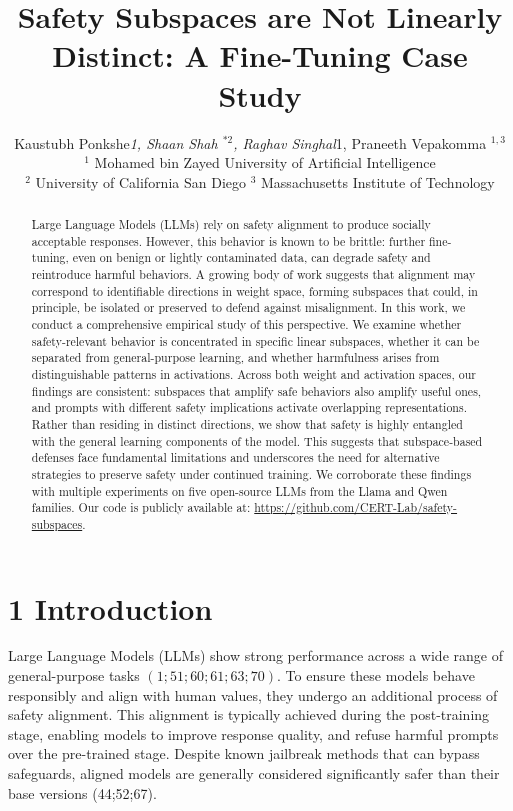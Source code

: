 \documentclass[10pt]{article}
\title{Safety Subspaces are Not Linearly Distinct: A Fine-Tuning Case Study }
\author{Kaustubh Ponkshe\textit{1, Shaan Shah ${ }^{* 2}$, Raghav Singhal}1, Praneeth Vepakomma ${ }^{1,3}$\\
${ }^{1}$ Mohamed bin Zayed University of Artificial Intelligence\\
${ }^{2}$ University of California San Diego ${ }^{3}$ Massachusetts Institute of Technology}
\date{}
\begin{document}
\maketitle
\captionsetup{singlelinecheck=false}


\begin{abstract}
Large Language Models (LLMs) rely on safety alignment to produce socially acceptable responses. However, this behavior is known to be brittle: further fine-tuning, even on benign or lightly contaminated data, can degrade safety and reintroduce harmful behaviors. A growing body of work suggests that alignment may correspond to identifiable directions in weight space, forming subspaces that could, in principle, be isolated or preserved to defend against misalignment. In this work, we conduct a comprehensive empirical study of this perspective. We examine whether safety-relevant behavior is concentrated in specific linear subspaces, whether it can be separated from general-purpose learning, and whether harmfulness arises from distinguishable patterns in activations. Across both weight and activation spaces, our findings are consistent: subspaces that amplify safe behaviors also amplify useful ones, and prompts with different safety implications activate overlapping representations. Rather than residing in distinct directions, we show that safety is highly entangled with the general learning components of the model. This suggests that subspace-based defenses face fundamental limitations and underscores the need for alternative strategies to preserve safety under continued training. We corroborate these findings with multiple experiments on five open-source LLMs from the Llama and Qwen families. Our code is publicly available at: \href{https://github.com/CERT-Lab/safety-subspaces}{https://github.com/CERT-Lab/safety-subspaces}.
\end{abstract}

\section*{1 Introduction}
Large Language Models (LLMs) show strong performance across a wide range of general-purpose tasks $(1 ; 51 ; 60 ; 61 ; 63 ; 70)$. To ensure these models behave responsibly and align with human values, they undergo an additional process of safety alignment. This alignment is typically achieved during the post-training stage, enabling models to improve response quality, and refuse harmful prompts over the pre-trained stage. Despite known jailbreak methods that can bypass safeguards, aligned models are generally considered significantly safer than their base versions (44;52;67).
\end{document}
